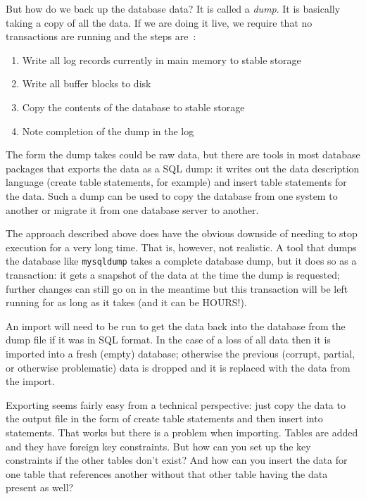 But how do we back up the database data? It is called a \textit{dump}. It is basically taking a copy of all the data. If we are doing it live, we require that no transactions are running and the steps are~\cite{dsc}:

\begin{enumerate}
	\item Write all log records currently in main memory to stable storage
	\item Write all buffer blocks to disk
	\item Copy the contents of the database to stable storage
	\item Note completion of the dump in the log
\end{enumerate}

The form the dump takes could be raw data, but there are tools in most database packages that exports the data as a SQL dump: it writes out the data description language (create table statements, for example) and insert table statements for the data. Such a dump can be used to copy the database from one system to another or migrate it from one database server to another.

The approach described above does have the obvious downside of needing to stop execution for a very long time. That is, however, not realistic. A tool that dumps the database like \texttt{mysqldump} takes a complete database dump, but it does so as a transaction: it gets a snapshot of the data at the time the dump is requested; further changes can still go on in the meantime but this transaction will be left running for as long as it takes (and it can be HOURS!).

An import will need to be run to get the data back into the database from the dump file if it was in SQL format. In the case of a loss of all data then it is imported into a fresh (empty) database; otherwise the previous (corrupt, partial, or otherwise problematic) data is dropped and it is replaced with the data from the import.

Exporting seems fairly easy from a technical perspective: just copy the data to the output file in the form of create table statements and then insert into statements. That works but there is a problem when importing. Tables are added and they have foreign key constraints. But how can you set up the key constraints if the other tables don't exist? And how can you insert the data for one table that references another without that other table having the data present as well?

